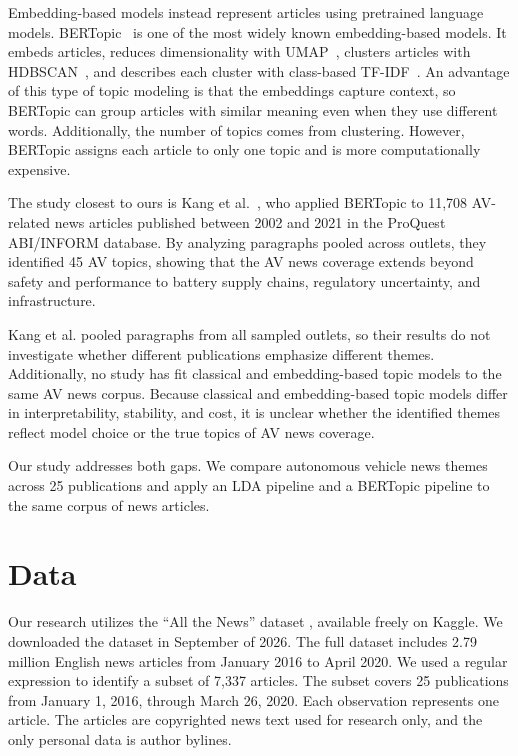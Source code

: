 \documentclass[conference]{IEEEtran}
\begin{document}
Embedding-based models instead represent articles using pretrained language models. BERTopic~\cite{grootendorst2022bertopic} is one of the most widely known embedding-based models. It embeds articles, reduces dimensionality with UMAP~\cite{mcinnes2018umap}, clusters articles with HDBSCAN~\cite{campello2013hdbscan}, and describes each cluster with class-based TF-IDF~\cite{alammar2024}. An advantage of this type of topic modeling is that the embeddings capture context, so BERTopic can group articles with similar meaning even when they use different words. Additionally, the number of topics comes from clustering. However, BERTopic assigns each article to only one topic and is more computationally expensive.

The study closest to ours is Kang et al.~\cite{kang2025unveiling}, who applied BERTopic to 11,708 AV-related news articles published between 2002 and 2021 in the ProQuest ABI/INFORM database. By analyzing paragraphs pooled across outlets, they identified 45 AV topics, showing that the AV news coverage extends beyond safety and performance to battery supply chains, regulatory uncertainty, and infrastructure.

Kang et al. pooled paragraphs from all sampled outlets, so their results do not investigate whether different publications emphasize different themes. Additionally, no study has fit classical and embedding-based topic models to the same AV news corpus. Because classical and embedding-based topic models differ in interpretability, stability, and cost, it is unclear whether the identified themes reflect model choice or the true topics of AV news coverage.

Our study addresses both gaps. We compare autonomous vehicle news themes across 25 publications and apply an LDA pipeline and a BERTopic pipeline to the same corpus of news articles.


\section*{Data}
Our research utilizes the ``All the News'' dataset \cite{mckinley2021}, available freely on Kaggle. We downloaded the dataset in September of 2026. The full dataset includes 2.79 million English news articles from January 2016 to April 2020. We used a regular expression to identify a subset of 7,337 articles. The subset covers 25 publications from January 1, 2016, through March 26, 2020. Each observation represents one article. The articles are copyrighted news text used for research only, and the only personal data is author bylines.
\end{document}

